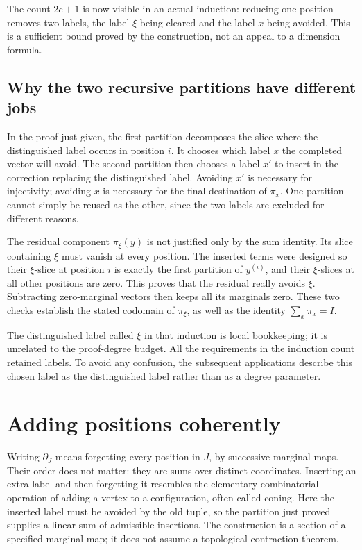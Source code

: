\documentclass[11pt,a4paper,oneside,openany]{book}
\theoremstyle{definition}\newtheorem{definition}[theorem]{Definition}
\theoremstyle{remark}\newtheorem{remark}[theorem]{Remark}
\numberwithin{equation}{chapter}
\begin{document}
The count $2c+1$ is now visible in an actual induction: reducing one position removes two labels, the label $\xi$ being cleared and the label $x$ being avoided. This is a sufficient bound proved by the construction, not an appeal to a dimension formula.

\subsection{Why the two recursive partitions have different jobs}
In the proof just given, the first partition decomposes the slice
where the distinguished label occurs in position $i$. It chooses
which label $x$ the completed vector will avoid. The second partition
then chooses a label $x'$ to insert in the correction replacing the
distinguished label. Avoiding $x'$ is necessary for injectivity;
avoiding $x$ is necessary for the final destination of $\pi_x$.
One partition cannot simply be reused as the other, since the two
labels are excluded for different reasons.

The residual component $\pi_\xi(y)$ is not justified only by the sum
identity. Its slice containing $\xi$ must vanish at every position.
The inserted terms were designed so their $\xi$-slice at position $i$
is exactly the first partition of $y^{(i)}$, and their $\xi$-slices at
all other positions are zero. This proves that the residual really
avoids $\xi$. Subtracting zero-marginal vectors then keeps all its
marginals zero. These two checks establish the stated codomain of
$\pi_\xi$, as well as the identity $\sum_x\pi_x=I$.

The distinguished label called $\xi$ in that induction is local
bookkeeping; it is unrelated to the proof-degree budget. All the
requirements in the induction count retained labels. To avoid any
confusion, the subsequent applications describe this chosen label
as the distinguished label rather than as a degree parameter.

\section{Adding positions coherently}\label{tx:sec:cone}
Writing $\partial_J$ means forgetting every position in $J$, by
successive marginal maps. Their order does not matter: they are sums
over distinct coordinates. Inserting an extra label and then forgetting
it resembles the elementary combinatorial operation of adding a vertex
to a configuration, often called coning. Here the inserted label must
be avoided by the old tuple, so the partition just proved supplies a
linear sum of admissible insertions. The construction is a section of
a specified marginal map; it does not assume a topological contraction
theorem.
\end{document}
